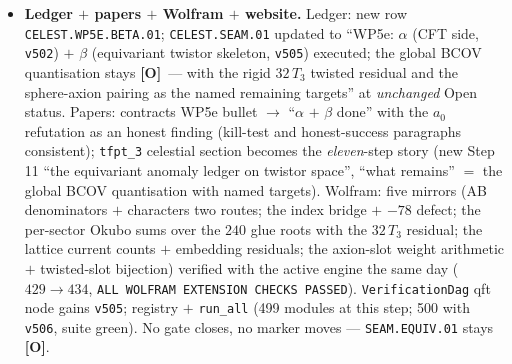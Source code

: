 \documentclass[11pt]{article}
\providecommand{\mO}{\textbf{[O]}}\providecommand{\mX}{\textbf{[X]}}
\begin{document}
\begin{itemize}[leftmargin=1.5em]
count $0$, $c$-prefactor $-31/48\neq-\tfrac13$. \mC\ dictionaries ($\mathrm{CS}(\rho)\bmod1$ $=$
discriminant weight; $32=(h,h){+}(h',h')$; $-30=-h^\vee$; $\Omega$-contraction). \mO\ the global
BCOV/KS quantisation, non-fixed-point contributions, the $O(-2)$ bulk axion, CPS level-from-flux,
the pairing $32\,T_3\leftrightarrow$ sphere axions. VERDICT B; the kill test does not fire on the
equivariant skeleton.
\item \textbf{Ledger $+$ papers $+$ Wolfram $+$ website.} Ledger: new row
\texttt{CELEST.WP5E.BETA.01}; \texttt{CELEST.SEAM.01} updated to ``WP5e: $\alpha$ (CFT side,
\texttt{v502}) $+$ $\beta$ (equivariant twistor skeleton, \texttt{v505}) executed; the global BCOV
quantisation stays \mO\ --- with the rigid $32\,T_3$ twisted residual and the sphere-axion pairing
as the named remaining targets'' at \emph{unchanged} Open status. Papers: contracts WP5e bullet
$\to$ ``$\alpha$ $+$ $\beta$ done'' with the $a_0$ refutation as an honest finding (kill-test and
honest-success paragraphs consistent); \texttt{tfpt\_3} celestial section becomes the
\emph{eleven}-step story (new Step 11 ``the equivariant anomaly ledger on twistor space'', ``what
remains'' $=$ the global BCOV quantisation with named targets). Wolfram: five mirrors (AB
denominators $+$ characters two routes; the index bridge $+$ $-78$ defect; the per-sector Okubo
sums over the $240$ glue roots with the $32\,T_3$ residual; the lattice current counts $+$
embedding residuals; the axion-slot weight arithmetic $+$ twisted-slot bijection) verified with
the active engine the same day ($429\to434$, \texttt{ALL WOLFRAM EXTENSION CHECKS PASSED}).
\texttt{VerificationDag} qft node gains \texttt{v505}; registry $+$ \texttt{run\_all} (499
modules at this step; 500 with \texttt{v506}, suite green). No gate closes, no marker moves ---
\texttt{SEAM.EQUIV.01} stays \mO.
\end{itemize}
\end{document}
